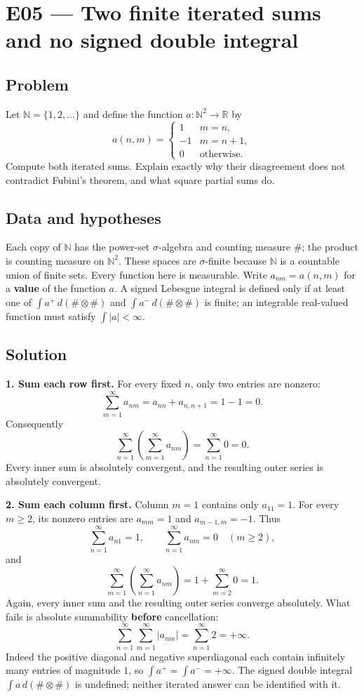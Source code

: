 \documentclass[
  11pt,
]{article}
\begin{document}
\section{E05 --- Two finite iterated sums and no signed double
integral}\label{E05}

\subsection{Problem}\label{problem-4}

Let \(\mathbb N=\{1,2,\ldots\}\) and define the function
\(a:\mathbb N^2\to\mathbb R\) by \[
a(n,m)=\begin{cases}1&m=n,\\-1&m=n+1,\\0&\text{otherwise}.\end{cases}
\] Compute both iterated sums. Explain exactly why their disagreement
does not contradict Fubini's theorem, and what square partial sums do.

\subsection{Data and hypotheses}\label{data-and-hypotheses-4}

Each copy of \(\mathbb N\) has the power-set \(\sigma\)-algebra and
counting measure \(\#\); the product is counting measure on
\(\mathbb N^2\). These spaces are \(\sigma\)-finite because
\(\mathbb N\) is a countable union of finite sets. Every function here
is measurable. Write \(a_{nm}=a(n,m)\) for a \textbf{value} of the
function \(a\). A signed Lebesgue integral is defined only if at least
one of \(\int a^+\,d(\#\otimes\#)\) and \(\int a^-\,d(\#\otimes\#)\) is
finite; an integrable real-valued function must satisfy
\(\int|a|<\infty\).

\subsection{Solution}\label{solution-4}

\textbf{1. Sum each row first.} For every fixed \(n\), only two entries
are nonzero: \[
\sum_{m=1}^{\infty}a_{nm}=a_{nn}+a_{n,n+1}=1-1=0.
\] Consequently \[
\sum_{n=1}^{\infty}\left(\sum_{m=1}^{\infty}a_{nm}\right)=\sum_{n=1}^{\infty}0=0.
\] Every inner sum is absolutely convergent, and the resulting outer
series is absolutely convergent.

\textbf{2. Sum each column first.} Column \(m=1\) contains only
\(a_{11}=1\). For every \(m\ge2\), its nonzero entries are \(a_{mm}=1\)
and \(a_{m-1,m}=-1\). Thus \[
\sum_{n=1}^{\infty}a_{n1}=1,\qquad
\sum_{n=1}^{\infty}a_{nm}=0\quad(m\ge2),
\] and \[
\sum_{m=1}^{\infty}\left(\sum_{n=1}^{\infty}a_{nm}\right)=1+\sum_{m=2}^{\infty}0=1.
\] Again, every inner sum and the resulting outer series converge
absolutely. What fails is absolute summability \textbf{before}
cancellation: \[
\sum_{n=1}^{\infty}\sum_{m=1}^{\infty}|a_{nm}|
=\sum_{n=1}^{\infty}2=+\infty.
\] Indeed the positive diagonal and negative superdiagonal each contain
infinitely many entries of magnitude \(1\), so
\(\int a^+=\int a^-=+\infty\). The signed double integral
\(\int a\,d(\#\otimes\#)\) is undefined; neither iterated answer can be
identified with it.
\end{document}

